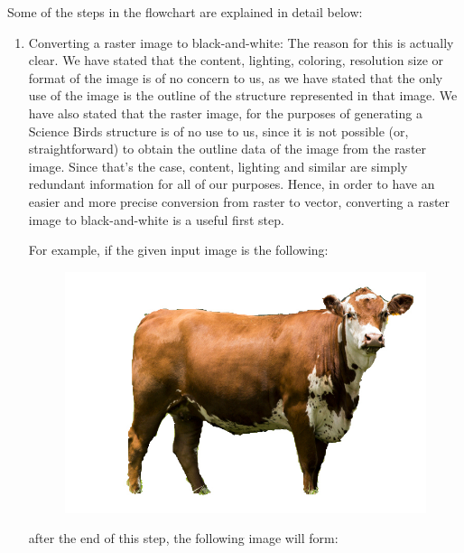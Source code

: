 \documentclass{dalthesis}
\begin{document}
Some of the steps in the flowchart are explained in detail below:

\begin{enumerate}
  \item Converting a raster image to black-and-white: The reason for this is actually clear. We have stated that the content, lighting, coloring, resolution size or format of the image is of no concern to us, as we have stated that the only use of the image is the outline of the structure represented in that image. We have also stated that the raster image, for the purposes of generating a Science Birds structure is of no use to us, since it is not possible (or, straightforward) to obtain the outline data of the image from the raster image. Since that's the case, content, lighting and similar are simply redundant information for all of our purposes. Hence, in order to have an easier and more precise conversion from raster to vector, converting a raster image to black-and-white is a useful first step.

  For example, if the given input image is the following:

  \begin{figure}[H]
    \centering
    \includegraphics[width=\textwidth,height=\textheight,keepaspectratio]{process/cow.jpg}
  \end{figure}

  after the end of this step, the following image will form:


\end{enumerate}
\end{document}
